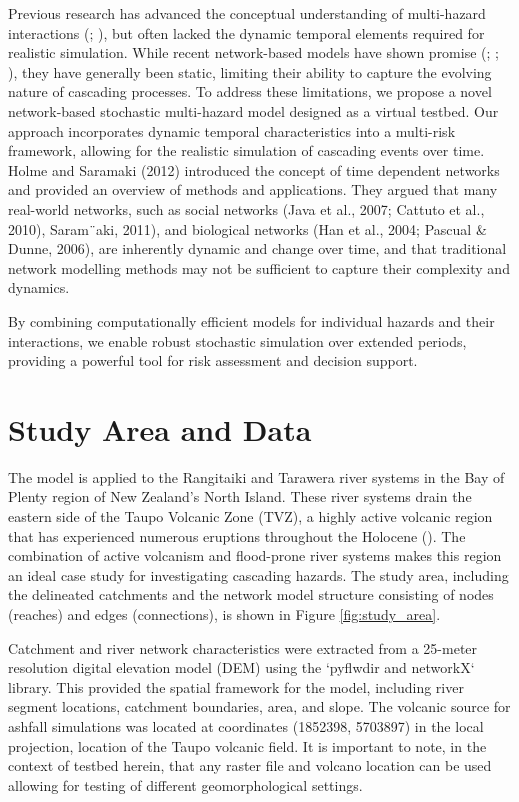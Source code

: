 \documentclass[12pt, a4paper]{article}
\begin{document}
Previous research has advanced the conceptual understanding of multi-hazard interactions (\citealp{Gill2014}; \citealp{DeAngeli2022}), but often lacked the dynamic temporal elements required for realistic simulation. While recent network-based models have shown promise (\citealp{Dunant2021a}; \citealp{Dunant2021b}; \citealp{Dunant2025}), they have generally been static, limiting their ability to capture the evolving nature of cascading processes. To address these limitations, we propose a novel network-based stochastic multi-hazard model designed as a virtual testbed. Our approach incorporates dynamic temporal characteristics into a multi-risk framework, allowing for the realistic simulation of cascading events over time. Holme and Saramaki (2012) introduced the concept of time dependent networks and provided an overview of methods and applications. They argued that many real-world networks, such as social networks (Java et al., 2007; Cattuto et al., 2010), Saram¨aki, 2011), and biological networks (Han et al., 2004; Pascual & Dunne, 2006), are inherently dynamic and change over time, and that traditional network modelling methods may not be sufficient to capture their complexity and dynamics. 

By combining computationally efficient models for individual hazards and their interactions, we enable robust stochastic simulation over extended periods, providing a powerful tool for risk assessment and decision support.

\section{Study Area and Data}
The model is applied to the Rangitaiki and Tarawera river systems in the Bay of Plenty region of New Zealand’s North Island. These river systems drain the eastern side of the Taupo Volcanic Zone (TVZ), a highly active volcanic region that has experienced numerous eruptions throughout the Holocene (\citealp{Nairn2002}). The combination of active volcanism and flood-prone river systems makes this region an ideal case study for investigating cascading hazards. The study area, including the delineated catchments and the network model structure consisting of nodes (reaches) and edges (connections), is shown in Figure \ref{fig:study_area}.

Catchment and river network characteristics were extracted from a 25-meter resolution digital elevation model (DEM) using the `pyflwdir and networkX` library. This provided the spatial framework for the model, including river segment locations, catchment boundaries, area, and slope. The volcanic source for ashfall simulations was located at coordinates (1852398, 5703897) in the local projection, location of the Taupo volcanic field. It is important to note, in the context of testbed herein, that any raster file and volcano location can be used allowing for testing of different geomorphological settings.
\end{document}

